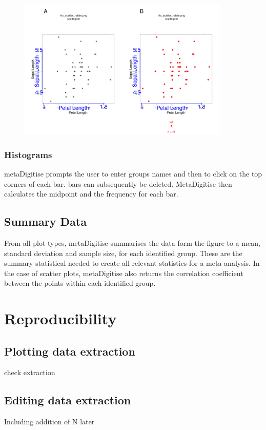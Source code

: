 \documentclass{article}
\begin{document}
\begin{figure}[!h] 
 \includegraphics[width=0.9\textwidth]{fig_scatter_points.pdf} 
 \caption{ }
\label{fig:scatter_points}
\end{figure}


\subsubsection{Histograms}
metaDigitise prompts the user to enter groups names and then to click on the top corners of each bar. bars can subsequently be deleted. MetaDigitise then calculates the midpoint and the frequency for each bar. 


\subsection{Summary Data}
From all plot types, metaDigitise summarises the data form the figure to a mean, standard deviation and sample size, for each identified group. These are the summary statistical needed to create all relevant statistics for a meta-analysis. In the case of scatter plots, metaDigitise also returns the correlation coefficient between the points within each identified group. 





\section{Reproducibility}

\subsection{Plotting data extraction}
check extraction

\subsection{Editing data extraction}
Including addition of N later
\end{document}

